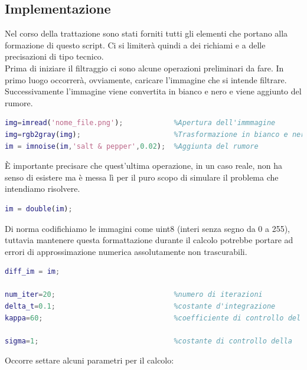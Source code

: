 \subsection{Implementazione}
Nel corso della trattazione sono stati forniti tutti gli elementi che portano alla formazione di questo script. Ci si limiterà quindi a dei richiami e a delle precisazioni di tipo tecnico.\\
\vspace{1em}
Prima di iniziare il filtraggio ci sono alcune operazioni preliminari da fare. In primo luogo occorrerà, ovviamente, caricare l'immagine che si intende filtrare. Successivamente l'immagine viene convertita in bianco e nero e viene aggiunto del rumore.\\
\begin{lstlisting}[language=MATLAB, name=listato]
img=imread('nome_file.png');            %Apertura dell'immmagine
img=rgb2gray(img);                      %Trasformazione in bianco e nero
im = imnoise(im,'salt & pepper',0.02);  %Aggiunta del rumore
\end{lstlisting}
\`E importante precisare che quest'ultima operazione, in un caso reale, non ha senso di esistere ma è messa lì per il puro scopo di simulare il problema che intendiamo risolvere.
\begin{lstlisting}[language=MATLAB, name=listato]
% conversione in double per il calcolo.
im = double(im);
\end{lstlisting}
Di norma codifichiamo le immagini come uint8 (interi senza segno da 0 a 255), tuttavia mantenere questa formattazione durante il calcolo potrebbe portare ad errori di approssimazione numerica assolutamente non trascurabili.
\begin{lstlisting}[language=MATLAB, name=listato]
% Condizioni iniziali della PDE.
diff_im = im;

num_iter=20;                            %numero di iterazioni
delta_t=0.1;                            %costante d'integrazione
kappa=60;                               %coefficiente di controllo del                                       gradiente

sigma=1;                                %costante di controllo della                                         diffusione uniforme

\end{lstlisting}
Occorre settare alcuni parametri per il calcolo: 
